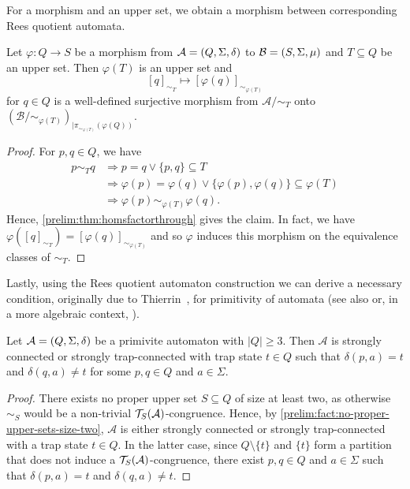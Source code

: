 For a morphism and an upper set, we obtain
a morphism between corresponding Rees quotient automata.

\begin{proposition} \label{prelim:prop:Rees-homsfactorthrough}
	Let $\varphi \colon Q \to S$ be a morphism
	from $\mathcal A = (Q, \Sigma, \delta)$
	to $\mathcal B = (S, \Sigma, \mu)$ and  $T \subseteq Q$ be an upper set.
	Then $\varphi(T)$ is an upper set %
	and 
	\[ [q]_{\sim_T} \mapsto [\varphi(q)]_{\sim_{\varphi(T)}}
	\]
	for $q \in Q$ is a well-defined surjective morphism from 
	$\mathcal A / {\sim_T}$ onto $( \mathcal B / {\sim_{\varphi(T)}} )_{|\pi_{\sim_{\varphi(T)}}(\varphi(Q))}$.
\end{proposition}
\begin{proof}
	For $p,q \in Q$, we have 
	\begin{align*}
		p \sim_T q & \Rightarrow p = q \lor \{p,q\} \subseteq T \\ 
		           & \Rightarrow \varphi(p) = \varphi(q) \lor \{\varphi(p), \varphi(q)\} \subseteq \varphi(T) \\ 
                   & \Rightarrow \varphi(p) \sim_{\varphi(T)} \varphi(q).
	\end{align*}
	Hence, \cref{prelim:thm:homsfactorthrough}
	gives the claim. In fact, we have $\varphi([q]_{\sim_T}) = [\varphi(q)]_{\sim_{\varphi(T)}}$
	and so $\varphi$ induces this morphism on the equivalence classes of $\sim_T$.
\end{proof}

Lastly, using the Rees quotient automaton construction
we can derive a necessary condition, originally due to Thierrin~\cite[Prop.~8]{DBLP:journals/kybernetika/Thierrin70},
for primitivity of automata (see also \cite[Cor.~3]{DBLP:journals/actaC/Babcsanyi07}
or, in a more algebraic context, \cite[Prop.~5.1]{Steinberg2010}).

\begin{proposition}
	\label{prelim:cor:simpleaut}
	Let $\mathcal A = (Q, \Sigma, \delta)$ be a primivite automaton with $|Q| \ge 3$. 
    Then $\mathcal A$ is strongly connected
    or strongly trap-connected with trap state $t \in Q$
    such that 	$\delta(p, a) = t$ and $\delta(q, a) \ne t$
    for some $p,q \in Q$ and $a \in \Sigma$.
\end{proposition}
\begin{proof}	
	There exists no proper upper set $S \subseteq Q$ of size at least two,
	as otherwise~$\sim_S$ would be a non-trivial $\mathcal T_S(\mathcal A)$-congruence.
	Hence, by \cref{prelim:fact:no-proper-upper-sets-size-two},
	$\mathcal A$ is either strongly connected or strongly trap-connected
	with a trap state $t \in Q$.
	In the latter case, since $Q \setminus \{t\}$ and $\{t\}$ form a partition
	that does not induce a $\mathcal T_S(\mathcal A)$-congruence,
	there exist $p,q \in Q$ and $a \in \Sigma$
	such that $\delta(p, a) = t$ and $\delta(q, a) \ne t$.
\end{proof}

